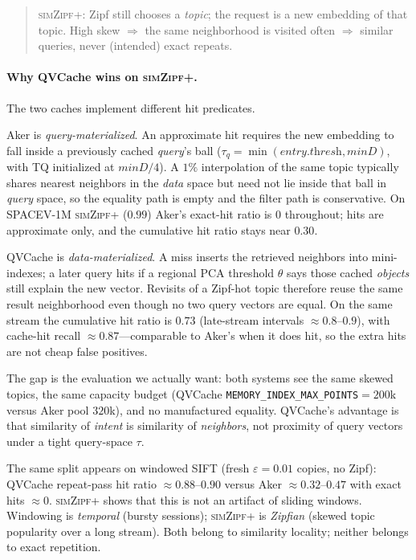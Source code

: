 \begin{quote}
\textsc{simZipf+}: Zipf still chooses a \emph{topic}; the request is a
new embedding of that topic. High skew $\Rightarrow$ the same
neighborhood is visited often $\Rightarrow$ similar queries, never
(intended) exact repeats.
\end{quote}

\paragraph{Why QVCache wins on \textsc{simZipf+}.}
The two caches implement different hit predicates.

Aker is \emph{query-materialized}. An approximate hit requires the new
embedding to fall inside a previously cached \emph{query}'s ball
($\tau_q=\min(\textit{entry.thresh},\textit{minD})$, with TQ
initialized at $\textit{minD}/4$). A $1\%$ interpolation of the same
topic typically shares nearest neighbors in the \emph{data} space but
need not lie inside that ball in \emph{query} space, so the equality
path is empty and the filter path is conservative. On SPACEV-1M
\textsc{simZipf+} ($0.99$) Aker's exact-hit ratio is $0$ throughout;
hits are approximate only, and the cumulative hit ratio stays near
$0.30$.

QVCache is \emph{data-materialized}. A miss inserts the retrieved
neighbors into mini-indexes; a later query hits if a regional PCA
threshold $\theta$ says those cached \emph{objects} still explain the
new vector. Revisits of a Zipf-hot topic therefore reuse the same
result neighborhood even though no two query vectors are equal. On
the same stream the cumulative hit ratio is $0.73$ (late-stream
intervals $\approx 0.8$--$0.9$), with cache-hit recall
$\approx 0.87$---comparable to Aker's when it does hit, so the extra
hits are not cheap false positives.

The gap is the evaluation we actually want: both systems see the same
skewed topics, the same capacity budget (QVCache
\texttt{MEMORY\_INDEX\_MAX\_POINTS}${}=200$k versus Aker pool
$320$k), and no manufactured equality. QVCache's advantage is that
similarity of \emph{intent} is similarity of \emph{neighbors}, not
proximity of query vectors under a tight query-space $\tau$.

The same split appears on windowed SIFT (fresh $\varepsilon{=}0.01$
copies, no Zipf): QVCache repeat-pass hit ratio $\approx 0.88$--$0.90$
versus Aker $\approx 0.32$--$0.47$ with exact hits $\approx 0$.
\textsc{simZipf+} shows that this is not an artifact of sliding
windows. Windowing is \emph{temporal} (bursty sessions);
\textsc{simZipf+} is \emph{Zipfian} (skewed topic popularity over a
long stream). Both belong to similarity locality; neither belongs to
exact repetition.

